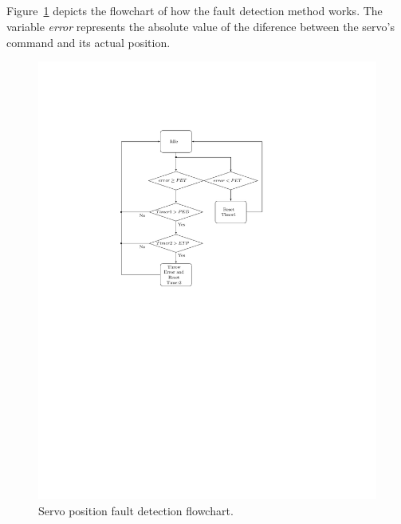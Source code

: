 \subsection{\secnameFlowchart}

Figure~\ref{fig:servoposfault} depicts the flowchart of how the fault detection method works. The variable \emph{error} represents the absolute value of the diference between the servo's command and its actual position.

\begin{figure}[htbp]
\begin{center}
\includegraphics*[viewport= 147 380 409 670, scale=0.8]{figures/servopositionfault.pdf}
\end{center}
\caption{Servo position fault detection flowchart.}\label{fig:servoposfault}
\end{figure}